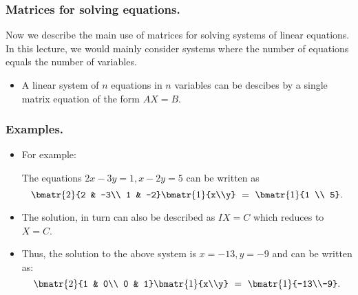 \begin{frame}%

  \frametitle{Matrices for solving equations.}
  Now we describe the main use of matrices for solving systems of linear
  equations. In this lecture, we would mainly consider systems where the
  number of equations equals the number of variables.
 
  \begin{itemize}%

    \item A linear system of $n$ equations in $n$ variables can be
    descibes by a single matrix equation of the form $AX=B$.



\end{itemize}

\end{frame}

\begin{frame}%
  \frametitle{Examples.}
  \begin{itemize}%
\item
    For example:
   
The equations $2x-3y=1,x-2y=5$ can be written as
$$\bmatr{2}{2 & -3\\ 1 & -2} \bmatr{1}{x\\y} ~=~ \bmatr{1}{1 \\ 5}.$$
  

\item The solution, in turn can also be described as $IX=C$ which
reduces to $X=C$.

\item
Thus, the solution to the above system is $x=-13, y=-9$ and can be
written as:
$$\bmatr{2}{1 & 0\\ 0 & 1}\bmatr{1}{x\\y} ~=~\bmatr{1}{-13\\-9}.$$



\end{itemize}
\end{frame}


